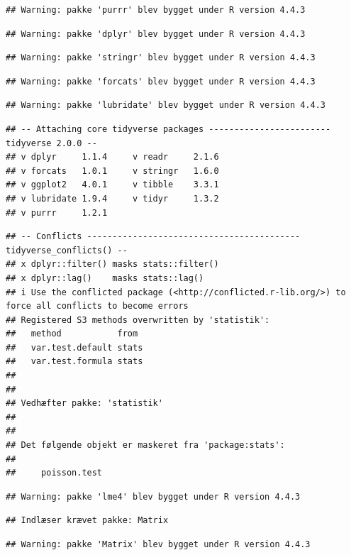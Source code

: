 \documentclass[
]{article}
\begin{document}
\begin{verbatim}
## Warning: pakke 'purrr' blev bygget under R version 4.4.3
\end{verbatim}

\begin{verbatim}
## Warning: pakke 'dplyr' blev bygget under R version 4.4.3
\end{verbatim}

\begin{verbatim}
## Warning: pakke 'stringr' blev bygget under R version 4.4.3
\end{verbatim}

\begin{verbatim}
## Warning: pakke 'forcats' blev bygget under R version 4.4.3
\end{verbatim}

\begin{verbatim}
## Warning: pakke 'lubridate' blev bygget under R version 4.4.3
\end{verbatim}

\begin{verbatim}
## -- Attaching core tidyverse packages ------------------------ tidyverse 2.0.0 --
## v dplyr     1.1.4     v readr     2.1.6
## v forcats   1.0.1     v stringr   1.6.0
## v ggplot2   4.0.1     v tibble    3.3.1
## v lubridate 1.9.4     v tidyr     1.3.2
## v purrr     1.2.1
\end{verbatim}

\begin{verbatim}
## -- Conflicts ------------------------------------------ tidyverse_conflicts() --
## x dplyr::filter() masks stats::filter()
## x dplyr::lag()    masks stats::lag()
## i Use the conflicted package (<http://conflicted.r-lib.org/>) to force all conflicts to become errors
## Registered S3 methods overwritten by 'statistik':
##   method           from 
##   var.test.default stats
##   var.test.formula stats
## 
## 
## Vedhæfter pakke: 'statistik'
## 
## 
## Det følgende objekt er maskeret fra 'package:stats':
## 
##     poisson.test
\end{verbatim}

\begin{verbatim}
## Warning: pakke 'lme4' blev bygget under R version 4.4.3
\end{verbatim}

\begin{verbatim}
## Indlæser krævet pakke: Matrix
\end{verbatim}

\begin{verbatim}
## Warning: pakke 'Matrix' blev bygget under R version 4.4.3
\end{verbatim}
\end{document}
